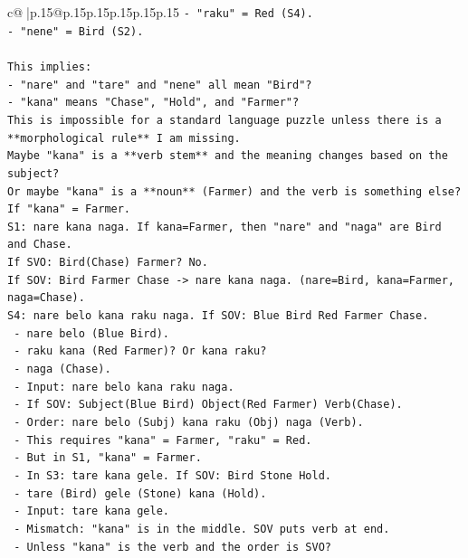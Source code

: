 \documentclass{article}
\begin{document}
{\begin{supertabular}{c@{$\;$}|p{.15\linewidth}@{}p{.15\linewidth}p{.15\linewidth}p{.15\linewidth}p{.15\linewidth}p{.15\linewidth}}
{{{\texttt{{-} "raku" = Red (S4).} \\
\texttt{{-} "nene" = Bird (S2).} \\
\\ 
\texttt{This implies:} \\
\texttt{{-} "nare" and "tare" and "nene" all mean "Bird"?} \\
\texttt{{-} "kana" means "Chase", "Hold", and "Farmer"?} \\
\texttt{This is impossible for a standard language puzzle unless there is a **morphological rule** I am missing.} \\
\texttt{Maybe "kana" is a **verb stem** and the meaning changes based on the subject?} \\
\texttt{Or maybe "kana" is a **noun** (Farmer) and the verb is something else?} \\
\texttt{If "kana" = Farmer.} \\
\texttt{S1: nare kana naga. If kana=Farmer, then "nare" and "naga" are Bird and Chase.} \\
\texttt{If SVO: Bird(Chase) Farmer? No.} \\
\texttt{If SOV: Bird Farmer Chase {-}> nare kana naga. (nare=Bird, kana=Farmer, naga=Chase).} \\
\texttt{S4: nare belo kana raku naga. If SOV: Blue Bird Red Farmer Chase.} \\
\texttt{  {-} nare belo (Blue Bird).} \\
\texttt{  {-} raku kana (Red Farmer)? Or kana raku?} \\
\texttt{  {-} naga (Chase).} \\
\texttt{  {-} Input: nare belo kana raku naga.} \\
\texttt{  {-} If SOV: Subject(Blue Bird) Object(Red Farmer) Verb(Chase).} \\
\texttt{  {-} Order: nare belo (Subj) kana raku (Obj) naga (Verb).} \\
\texttt{  {-} This requires "kana" = Farmer, "raku" = Red.} \\
\texttt{  {-} But in S1, "kana" = Farmer.} \\
\texttt{  {-} In S3: tare kana gele. If SOV: Bird Stone Hold.} \\
\texttt{    {-} tare (Bird) gele (Stone) kana (Hold).} \\
\texttt{    {-} Input: tare kana gele.} \\
\texttt{    {-} Mismatch: "kana" is in the middle. SOV puts verb at end.} \\
\texttt{    {-} Unless "kana" is the verb and the order is SVO?} \\
}}}
\end{supertabular}}
\end{document}
